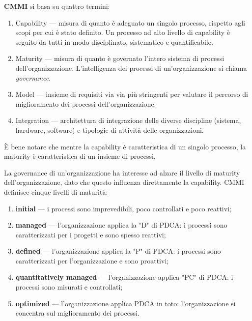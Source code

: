 \documentclass[a4paper]{article}
\begin{document}
\textbf{CMMI} si basa su quattro termini:
		
	\begin{enumerate}
		
			
	\item Capability — misura di quanto è adeguato un singolo processo, rispetto agli scopi per cui è stato definito. Un processo ad alto livello di capability è seguito da tutti in modo disciplinato, sistematico e quantificabile.
			
	\item Maturity — misura di quanto è governato l'intero sistema di processi dell'organizzazione. L'intelligenza dei processi di un'organizzazione si chiama \emph{governance}.
			
	\item Model — insieme di requisiti via via più stringenti per valutare il percorso di miglioramento dei processi dell'organizzazione.
			
	\item Integration — architettura di integrazione delle diverse discipline (sistema, hardware, software) e tipologie di attività delle organizzazioni.
		
	\end{enumerate}

		
È bene notare che mentre la capability è caratteristica di un singolo processo, la maturity è caratteristica di un insieme di processi.
		
La governance di un'organizzazione ha interesse ad alzare il livello di maturity dell'organizzazione, dato che questo influenza direttamente la capability. CMMI definisce cinque livelli di maturità:
		
	\begin{enumerate}
		
			
	\item \textbf{initial} — i processi sono imprevedibili, poco controllati e poco reattivi;
			
	\item \textbf{managed} — l'organizzazione applica la "D" di PDCA: i processi sono caratterizzati per i progetti e sono spesso reattivi;
			
	\item \textbf{defined} — l'organizzazione applica la "P" di PDCA: i processi sono caratterizzati per l'organizzazione e sono proattivi;
			
	\item \textbf{quantitatively managed} — l'organizzazione applica "PC" di PDCA: i processi sono misurati e controllati;
			
	\item \textbf{optimized} — l'organizzazione applica PDCA in toto: l'organizzazione si concentra sul miglioramento dei processi.
		
	\end{enumerate}
\end{document}
